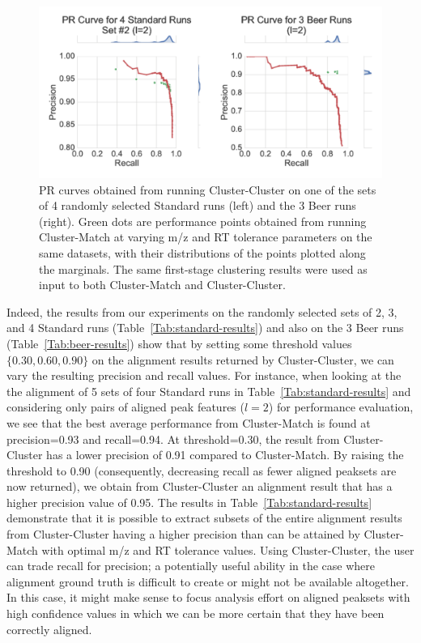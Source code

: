 \begin{figure}[!htbp]
\centering\includegraphics[width=1.0\linewidth]{06-precursor-cluster/figures/fig4.pdf}
\centering\caption{\label{fig:04} PR curves obtained from running Cluster-Cluster on one of the sets of 4 randomly selected Standard runs (left) and the 3 Beer runs (right). Green dots are performance points obtained from running Cluster-Match at varying m/z and RT tolerance parameters on the same datasets, with their distributions of the points plotted along the marginals. The same first-stage clustering results were used as input to both Cluster-Match and Cluster-Cluster.}
\end{figure}

Indeed, the results from our experiments on the randomly selected sets of 2, 3, and 4 Standard runs (Table~\ref{Tab:standard-results}) and also on the 3 Beer runs (Table~\ref{Tab:beer-results}) show that by setting some threshold values $\{0.30, 0.60, 0.90\}$ on the alignment results returned by Cluster-Cluster, we can vary the resulting precision and recall values. For instance, when looking at the the alignment of 5 sets of four Standard runs in Table~\ref{Tab:standard-results} and considering only pairs of aligned peak features ($l=2$) for performance evaluation, we see that the best average performance from Cluster-Match is found at precision=0.93 and recall=0.94. At threshold=0.30, the result from Cluster-Cluster has a lower precision of 0.91 compared to Cluster-Match. By raising the threshold to 0.90 (consequently, decreasing recall as fewer aligned peaksets are now returned), we obtain from Cluster-Cluster an alignment result that has a higher precision value of 0.95. The results in Table~\ref{Tab:standard-results} demonstrate that it is possible to extract subsets of the entire alignment results from Cluster-Cluster having a higher precision than can be attained by Cluster-Match with optimal m/z and RT tolerance values. Using Cluster-Cluster, the user can trade recall for precision; a potentially useful ability in the case where alignment ground truth is difficult to create or might not be available altogether. In this case, it might make sense to focus analysis effort on aligned peaksets with high confidence values in which we can be more certain that they have been correctly aligned.

